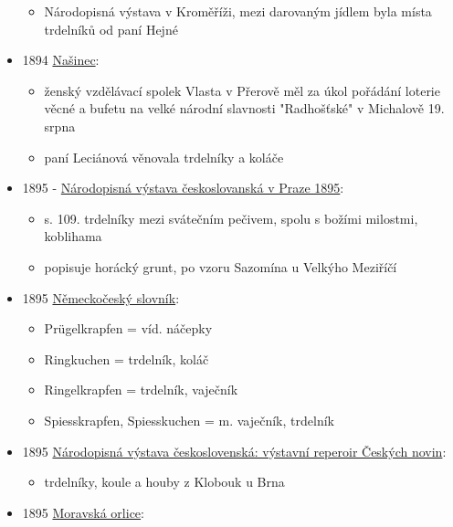 \begin{itemize}
  \begin{itemize}
  \tightlist
  \item
    Národopisná výstava v Kroměříži, mezi darovaným jídlem byla místa
    trdelníků od paní Hejné
  \end{itemize}
\item
  1894
  \href{https://ceskadigitalniknihovna.cz/uuid/uuid:a0df34ac-8228-11e0-b92b-0050569d679d}{Našinec}:

  \begin{itemize}
  \tightlist
  \item
    ženský vzdělávací spolek Vlasta v Přerově měl za úkol pořádání
    loterie věcné a bufetu na velké národní slavnosti "Radhošťské" v
    Michalově 19. srpna
  \item
    paní Leciánová věnovala trdelníky a koláče
  \end{itemize}
\item
  1895 -
  \href{https://ceskadigitalniknihovna.cz/view/uuid:a69c34d0-f3fe-11dc-a2df-000d606f5dc6?page=uuid\%3Aa5170ee0-7b0a-11e6-ad48-005056825209&fulltext=trdeln\%C3\%ADk\%20OR\%20trdeln\%C3\%ADky\%20OR\%20trdeln\%C3\%ADk\%C5\%AF&source=nkp}{
  Národopisná výstava českoslovanská v Praze 1895}:

  \begin{itemize}
  \tightlist
  \item
    s. 109. trdelníky mezi svátečním pečivem, spolu s božími milostmi,
    koblihama
  \item
    popisuje horácký grunt, po vzoru Sazomína u Velkýho Meziříčí
  \end{itemize}
\item
  1895
  \href{https://ceskadigitalniknihovna.cz/uuid/uuid:a7ab5cf0-1dae-11e7-a38c-005056827e51}{Německočeský
  slovník}:

  \begin{itemize}
  \tightlist
  \item
    Prügelkrapfen = víd. náčepky
  \item
    Ringkuchen = trdelník, koláč
  \item
    Ringelkrapfen = trdelník, vaječník
  \item
    Spiesskrapfen, Spiesskuchen = m. vaječník, trdelník
  \end{itemize}
\item
  1895
  \href{https://ceskadigitalniknihovna.cz/uuid/uuid:67436920-adcf-11ed-9763-5ef3fc9bb22f}{Národopisná
  výstava československá: výstavní reperoir Českých novin}:

  \begin{itemize}
  \tightlist
  \item
    trdelníky, koule a houby z Klobouk u Brna
  \end{itemize}
\item
  1895
  \href{https://ceskadigitalniknihovna.cz/view/uuid:0519cc62-32f0-11de-992b-00145e5790ea?page=uuid:2a76016a-32f0-11de-992b-00145e5790ea&fulltext=trdel*&source=mzk}{Moravská
  orlice}:


\end{itemize}
